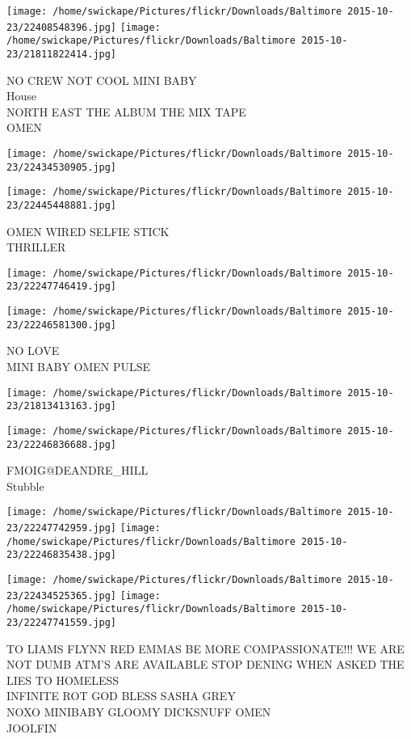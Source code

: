 \documentclass[10pt,letterpaper]{article}
\begin{document}
\texttt{[image: /home/swickape/Pictures/flickr/Downloads/Baltimore 2015-10-23/22408548396.jpg]}
\texttt{[image: /home/swickape/Pictures/flickr/Downloads/Baltimore 2015-10-23/21811822414.jpg]}

NO CREW NOT COOL MINI BABY\\
House\\
NORTH EAST THE ALBUM THE MIX TAPE\\
OMEN
\pagebreak

\texttt{[image: /home/swickape/Pictures/flickr/Downloads/Baltimore 2015-10-23/22434530905.jpg]}

\vspace{0.25in}
\texttt{[image: /home/swickape/Pictures/flickr/Downloads/Baltimore 2015-10-23/22445448881.jpg]}

OMEN WIRED SELFIE STICK\\
THRILLER
\pagebreak

\texttt{[image: /home/swickape/Pictures/flickr/Downloads/Baltimore 2015-10-23/22247746419.jpg]}

\vspace{0.25in}
\texttt{[image: /home/swickape/Pictures/flickr/Downloads/Baltimore 2015-10-23/22246581300.jpg]}

NO LOVE\\
MINI BABY OMEN PULSE
\pagebreak

\texttt{[image: /home/swickape/Pictures/flickr/Downloads/Baltimore 2015-10-23/21813413163.jpg]}

\vspace{0.25in}
\texttt{[image: /home/swickape/Pictures/flickr/Downloads/Baltimore 2015-10-23/22246836688.jpg]}

FMOIG@DEANDRE\_HILL\\
Stubble
\pagebreak

\texttt{[image: /home/swickape/Pictures/flickr/Downloads/Baltimore 2015-10-23/22247742959.jpg]}
\texttt{[image: /home/swickape/Pictures/flickr/Downloads/Baltimore 2015-10-23/22246835438.jpg]}

\texttt{[image: /home/swickape/Pictures/flickr/Downloads/Baltimore 2015-10-23/22434525365.jpg]}
\texttt{[image: /home/swickape/Pictures/flickr/Downloads/Baltimore 2015-10-23/22247741559.jpg]}

TO LIAMS FLYNN RED EMMAS BE MORE COMPASSIONATE!!! WE ARE NOT DUMB ATM'S ARE AVAILABLE STOP DENING WHEN ASKED THE LIES TO HOMELESS\\
INFINITE ROT GOD BLESS SASHA GREY\\
NOXO MINIBABY GLOOMY DICKSNUFF OMEN\\
JOOLFIN
\pagebreak
\end{document}
